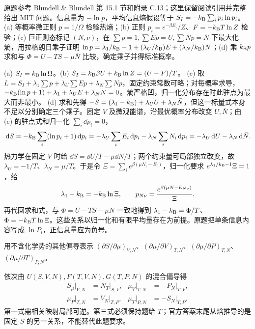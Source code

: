 \begin{center}\end{center}
\begin{exercise}
原题参考 Blundell \& Blundell 第 15.1 节和附录 C.13；这里保留阅读引用并完整给出 MIT 问题。信息量为 $-\ln p$，平均信息熵假设等于 $S_I=-k_{\mathrm B}\sum_i p_i\ln p_i$。
(a) 等概率微正则 $p=1/\Omega$ 检验热熵；(b) 正则 $p_i=e^{-\beta E_i}/Z$、$F=-k_{\mathrm B} T\ln Z$ 检验；(c) 巨正则态标记 $(N,\nu)$，在 $\sum p=1,\sum Ep=U,\sum Np=\bar N$ 下最大化熵，用拉格朗日乘子证明 $\ln p=\lambda_1/k_{\mathrm B}-1+(\lambda_U/k_{\mathrm B})E+(\lambda_N/k_{\mathrm B})N$；(d) 乘 $k_{\mathrm B} p$ 求和与 $\Phi=U-TS-\mu\bar N$ 比较，确定乘子并得标准概率。
\end{exercise}
\begin{solution}
(a) $S_I=k_{\mathrm B}\ln\Omega$。(b) $S_I=k_{\mathrm B}\beta U+k_{\mathrm B}\ln Z=(U-F)/T$。
(c) 取 $L=S_I+\lambda_1\sum p+\lambda_U\sum Ep+\lambda_N\sum Np$，固定约束常数可略；对每概率求导，$-k_{\mathrm B}(\ln p+1)+\lambda_1+\lambda_UE+\lambda_NN=0$。熵严格凹，归一化分布存在时此驻点为最大而非最小。
(d) 求和先得 $-S=(\lambda_1-k_{\mathrm B})+\lambda_UU+\lambda_N\bar N$，但这一标量式本身不足以分别确定三个乘子。固定 $V$ 及微观能谱，沿最优概率分布改变 $U,\bar N$；由 (c) 的驻点式和归一化 $\sum_i\dd p_i=0$，
\[\,\mathrm d S=-k_{\mathrm B}\sum_i(\ln p_i+1)\,\mathrm d p_i
=-\lambda_U\sum_iE_i\,\mathrm d p_i-\lambda_N\sum_iN_i\,\mathrm d p_i
=-\lambda_U\,\mathrm d U-\lambda_N\,\mathrm d\bar N.\]
热力学在固定 $V$ 时给 $\dd S=\dd U/T-\mu\dd\bar N/T$；两个约束量可局部独立改变，故 $\lambda_U=-1/T$、$\lambda_N=\mu/T$。于是令 $\Xi=\sum_i e^{\beta(\mu N_i-E_i)}$，归一化要求 $e^{\lambda_1/k_{\mathrm B}-1}\Xi=1$，给
\[\lambda_1-k_{\mathrm B}=-k_{\mathrm B}\ln\Xi,\qquad
p_{N\nu}=\frac{e^{\beta(\mu N-E_{N\nu})}}\Xi.\]
再代回求和式，与 $\Phi=U-TS-\mu\bar N$ 一致地得到 $\lambda_1-k_{\mathrm B}=\Phi/T$、$\Phi=-k_{\mathrm B} T\ln\Xi$。这些关系以归一化和有限平均量存在为前提。原题把单条信息内容写成 $\ln P_i$，正信息量应为负号。
\end{solution}
\begin{exercise}
用不含化学势的其他偏导表示 $(\partial S/\partial\mu)_{V,N}$、$(\partial\mu/\partial V)_{T,N}$、$(\partial\mu/\partial P)_{T,N}$、$(\partial\mu/\partial T)_{P,N}$。
\end{exercise}
\begin{solution}
依次由 $U(S,V,N),F(T,V,N),G(T,P,N)$ 的混合偏导得
\begin{align*}
S_\mu|_{V,N}&=N_T|_{S,V},&\mu_V|_{T,N}&=-P_N|_{T,V},\\
\mu_P|_{T,N}&=V_N|_{T,P},&\mu_T|_{P,N}&=-S_N|_{T,P}.
\end{align*}
第一式需相关映射局部可逆。第三式必须保持题给 $T$；官方答案末尾从焓推导的是固定 $S$ 的另一关系，不能替代此题要求。
\end{solution}
